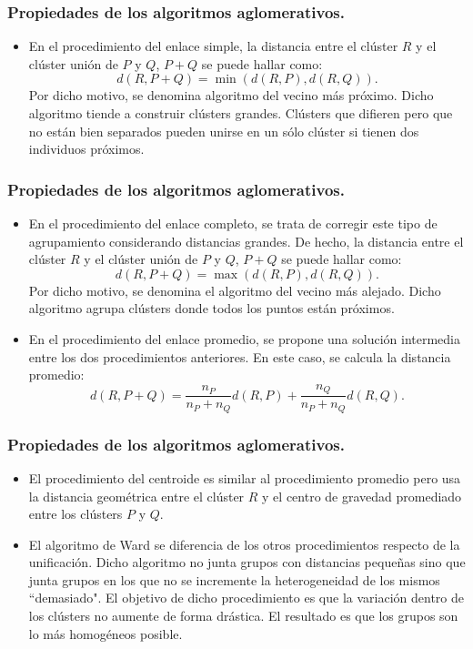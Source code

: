 \begin{frame}
\frametitle{Propiedades de los algoritmos aglomerativos.}
\begin{itemize}
\item<2->{En el procedimiento del enlace simple, la distancia entre el clúster $R$ y el clúster unión de $P$ y $Q$, $P+Q$ se puede hallar como:
$$
d(R,P+Q)=\min (d(R,P),d(R,Q)).
$$Por dicho motivo, se denomina algoritmo del vecino más próximo. Dicho algoritmo tiende a construir clústers grandes. Clústers que difieren pero que no están bien separados pueden unirse en un sólo clúster si tienen dos individuos próximos.} 
\end{itemize}
\end{frame}
\begin{frame}
\frametitle{Propiedades de los algoritmos aglomerativos.}
\begin{itemize}
\item<2->{En el procedimiento del enlace completo, se trata de corregir este tipo de agrupamiento considerando distancias grandes. De hecho, la distancia entre el clúster $R$ y el clúster unión de $P$ y $Q$, $P+Q$ se puede hallar como:
$$
d(R,P+Q)=\max (d(R,P),d(R,Q)).
$$Por dicho motivo, se denomina el algoritmo del vecino más alejado. Dicho algoritmo agrupa clústers donde todos los puntos están próximos.}
\item<3->{En el procedimiento del enlace promedio, se propone una solución intermedia entre los dos procedimientos anteriores. En este caso, se calcula la distancia promedio:
$$
d(R,P+Q)=\frac{n_P}{n_P + n_Q} d(R,P)+\frac{n_Q}{n_P + n_Q} d(R,Q).
$$}
\end{itemize}
\end{frame}
\begin{frame}
\frametitle{Propiedades de los algoritmos aglomerativos.}
\begin{itemize}
\item<2->{El procedimiento del centroide es similar al procedimiento promedio pero usa la distancia geométrica entre el clúster $R$ y el centro de gravedad promediado entre los clústers $P$ y $Q$.}
\item<3->{El algoritmo de Ward se diferencia de los otros procedimientos respecto de la unificación. Dicho algoritmo no junta grupos con distancias pequeñas sino que junta grupos en los que no se incremente la heterogeneidad de los mismos ``demasiado". El objetivo de dicho procedimiento es que la variación dentro de los clústers no aumente de forma drástica. El resultado es que los grupos son lo más homogéneos posible.}
\end{itemize}
\end{frame}

